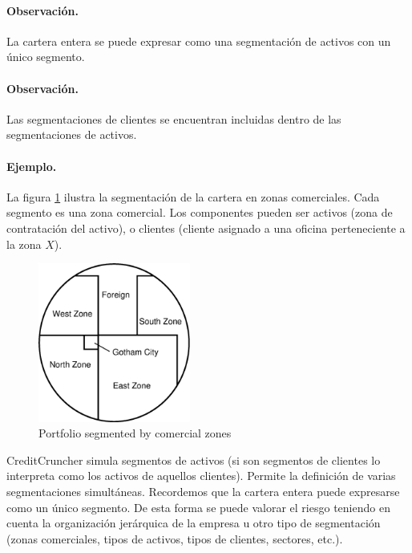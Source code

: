 \paragraph{Observaci\'on.} La cartera entera se puede expresar como una
segmentaci\'on de activos con un \'unico segmento.

\paragraph{Observaci\'on.} Las segmentaciones de clientes se encuentran
incluidas dentro de las segmentaciones de activos.

\paragraph{Ejemplo.} La figura \ref{fig:segments} ilustra la segmentaci\'on
de la cartera en zonas comerciales. Cada segmento es una zona comercial.
Los componentes pueden ser activos (zona de contrataci\'on del activo), o
clientes (cliente asignado a una oficina perteneciente a la zona $X$).

\begin{figure}[!hb]
\begin{center}
\includegraphics[width=5cm,angle=0]{./images/segments.eps}
\caption{Portfolio segmented by comercial zones}
\label{fig:segments}
\end{center}
\end{figure}

CreditCruncher simula segmentos de activos (si son segmentos de clientes lo
interpreta como los activos de aquellos clientes). Permite la definici\'on
de varias segmentaciones simult\'aneas. Recordemos que la cartera entera
puede expresarse como un \'unico segmento. De esta forma se puede valorar
el riesgo teniendo en cuenta la organizaci\'on jer\'arquica de la empresa
u otro tipo de segmentaci\'on (zonas comerciales, tipos de activos, tipos de
clientes, sectores, etc.).
\newline

